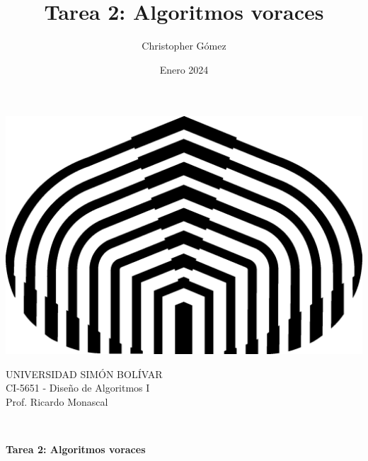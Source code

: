 \documentclass[letterpaper, 12pt]{article}
\title{Tarea 2: Algoritmos voraces}
\author{Christopher Gómez}
\date{Enero 2024}
\begin{document}
\parbox[t]{.5\linewidth}{
    \centering
    \includegraphics[scale=0.4]{logo.png}
    \begin{center}
        UNIVERSIDAD SIMÓN BOLÍVAR \\
        CI-5651 - Diseño de Algoritmos I \\
        Prof. Ricardo Monascal \\
    \end{center}
}
\hfill {}

\phantom{This text will be invisible} \\
\centerline {\textbf{Tarea 2: Algoritmos voraces}}
\justify
\end{document}
